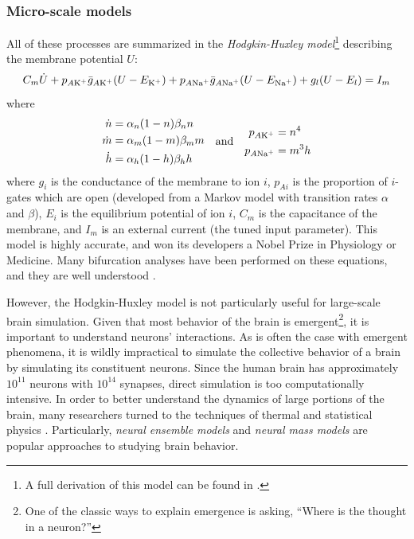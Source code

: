 \subsubsection{Micro-scale models}
\label{sec:intro_seizures_neuroanatomy_hodgkin_huxley}
All of these processes are summarized in the \textit{Hodgkin-Huxley model}\footnote{A full derivation of this model can be found in \cite{Graben2008}.} describing the membrane potential $U$:
\begin{equation}
  \label{eq:hodgkin_huxley_main}
  C_{m} \dot{U}
  +
  p_{A \ce{K^{+}}} \mean{g}_{A \ce{K^{+}}} \pqty{U - E_{\ce{K^{+}}}}
  +
  p_{A \ce{Na^{+}}} \mean{g}_{A \ce{Na^{+}}} \pqty{U - E_{\ce{Na^{+}}}}
  +
  g_{l} \pqty{U - E_{l}}
  =
  I_{m}
\end{equation}
where
\begin{equation}
  \label{eq:hodgkin_huxley_supplementary}
  \begin{aligned}
    \dot{n}
    &=
    \alpha_{n} \pqty{1 - n} \beta_{n} n \\
    \dot{m}
    &=
    \alpha_{m} \pqty{1 - m} \beta_{m} m \\
    \dot{h}
    &=
    \alpha_{h} \pqty{1 - h} \beta_{h} h
  \end{aligned}
  \qand
  \begin{aligned}
    p_{A \ce{K^{+}}}
    &=
    n^{4} \\
    p_{A \ce{Na^{+}}}
    &=
    m^{3} h
  \end{aligned}
\end{equation}
where $g_{i}$ is the conductance of the membrane to ion $i$, $p_{A i}$ is the proportion of $i$-gates which are open (developed from a Markov model with transition rates $\alpha$ and $\beta$), $E_{i}$ is the equilibrium potential of ion $i$, $C_{m}$ is the capacitance of the membrane, and $I_{m}$ is an external current (the tuned input parameter).
This model is highly accurate, and won its developers a Nobel Prize in Physiology or Medicine.
Many bifurcation analyses have been performed on these equations, and they are well understood \cite{Graben2008}.

However, the Hodgkin-Huxley model is not particularly useful for large-scale brain simulation.
Given that most behavior of the brain is emergent\footnote{One of the classic ways to explain emergence is asking, ``Where is the thought in a neuron?''}, it is important to understand neurons' interactions.
As is often the case with emergent phenomena, it is wildly impractical to simulate the collective behavior of a brain by simulating its constituent neurons.
Since the human brain has approximately $10^{11}$ neurons with $10^{14}$ synapses, direct simulation is too computationally intensive.
In order to better understand the dynamics of large portions of the brain, many researchers turned to the techniques of thermal and statistical physics \cite{Breakspear2017}.
Particularly, \textit{neural ensemble models} and \textit{neural mass models} are popular approaches to studying brain behavior.

